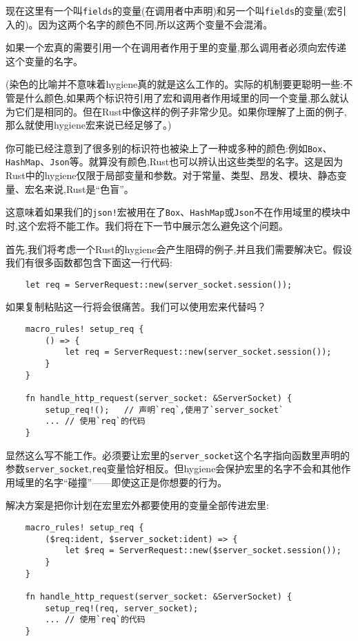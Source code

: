现在这里有一个叫\texttt{fields}的变量(在调用者中声明)和另一个叫\texttt{fields}的变量(宏引入的)。因为这两个名字的颜色不同,所以这两个变量不会混淆。

如果一个宏真的需要引用一个在调用者作用于里的变量,那么调用者必须向宏传递这个变量的名字。

(染色的比喻并不意味着hygiene真的就是这么工作的。实际的机制要更聪明一些:不管是什么颜色,如果两个标识符引用了宏和调用者作用域里的同一个变量,那么就认为它们是相同的。但在Rust中像这样的例子非常少见。如果你理解了上面的例子,那么就使用hygiene宏来说已经足够了。)

你可能已经注意到了很多别的标识符也被染上了一种或多种的颜色:例如\texttt{Box}、\texttt{HashMap}、\texttt{Json}等。就算没有颜色,Rust也可以辨认出这些类型的名字。这是因为Rust中的hygiene仅限于局部变量和参数。对于常量、类型、昂发、模块、静态变量、宏名来说,Rust是“色盲”。

这意味着如果我们的\texttt{json!}宏被用在了\texttt{Box}、\texttt{HashMap}或\texttt{Json}不在作用域里的模块中时,这个宏将不能工作。我们将在下一节中展示怎么避免这个问题。

首先,我们将考虑一个Rust的hygiene会产生阻碍的例子,并且我们需要解决它。假设我们有很多函数都包含下面这一行代码:
\begin{verbatim}
    let req = ServerRequest::new(server_socket.session());
\end{verbatim}

如果复制粘贴这一行将会很痛苦。我们可以使用宏来代替吗？
\begin{verbatim}
    macro_rules! setup_req {
        () => {
            let req = ServerRequest::new(server_socket.session());
        }
    }

    fn handle_http_request(server_socket: &ServerSocket) {
        setup_req!();   // 声明`req`,使用了`server_socket`
        ... // 使用`req`的代码
    }
\end{verbatim}

显然这么写不能工作。必须要让宏里的\texttt{server\_socket}这个名字指向函数里声明的参数\texttt{server\_socket},\texttt{req}变量恰好相反。但hygiene会保护宏里的名字不会和其他作用域里的名字“碰撞”——即使这正是你想要的行为。

解决方案是把你计划在宏里宏外都要使用的变量全部传进宏里:
\begin{verbatim}
    macro_rules! setup_req {
        ($req:ident, $server_socket:ident) => {
            let $req = ServerRequest::new($server_socket.session());
        }
    }

    fn handle_http_request(server_socket: &ServerSocket) {
        setup_req!(req, server_socket);
        ... // 使用`req`的代码
    }
\end{verbatim}

